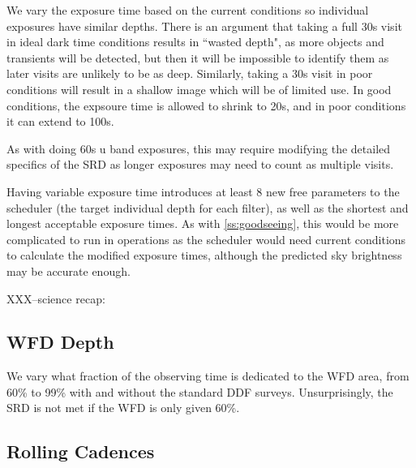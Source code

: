 We vary the exposure time based on the current conditions so individual exposures have similar depths. There is an argument that taking a full 30s visit in ideal dark time conditions results in ``wasted depth", as more objects and transients will be detected, but then it will be impossible to identify them as later visits are unlikely to be as deep. Similarly, taking a 30s visit in poor conditions will result in a shallow image which will be of limited use. In good conditions, the expsoure time is allowed to shrink to 20s, and in poor conditions it can extend to 100s.

As with doing 60s u band exposures, this may require modifying the detailed specifics of the SRD as longer exposures may need to count as multiple visits.

Having variable exposure time introduces at least 8 new free parameters to the scheduler (the target individual depth for each filter), as well as the shortest and longest acceptable exposure times.  As with \ref{ss:goodseeing}, this would be more complicated to run in operations as the scheduler would need current conditions to calculate the modified exposure times, although the predicted sky brightness may be accurate enough.

XXX--science recap:


\subsection{WFD Depth}

We vary what fraction of the observing time is dedicated to the WFD area, from 60\% to 99\% with and without the standard DDF surveys. Unsurprisingly, the SRD is not met if the WFD is only given 60\%.


\subsection{Rolling Cadences}

